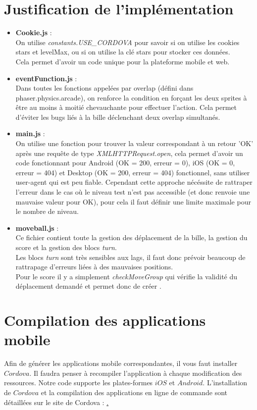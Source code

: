 \documentclass[11pt]{article}
\begin{document}
\section {Justification de l'implémentation}
\begin{itemize}
	\item
		\textbf{Cookie.js} :\\
		On utilise {\em constants.USE\_CORDOVA} pour savoir si on 
		utilise les cookies stars et levelMax, ou si on utilise
		la clé stars pour stocker ces données.\\
		Cela permet d'avoir un code unique pour la plateforme mobile et
		web.\\
	\item
		\textbf{eventFunction.js} :\\
		Dans toutes les fonctions appelées par overlap (défini dans 
		phaser.physics.arcade), on renforce la condition en forçant les
		deux sprites à être au moins à moitié chevauchante pour
		effectuer l'action. Cela permet d'éviter les bugs liés à la
		bille déclenchant deux overlap simultanés.\\
	\item
		\textbf{main.js} : \\
		On utilise une fonction pour trouver la valeur correspondant à
		un retour 'OK' après une requête de type 
		{\em XMLHTTPRequest.open}, cela permet d'avoir un code
		fonctionnant pour Android (OK = 200, erreur = 0), iOS (OK = 0,
		erreur = 404) et Desktop (OK = 200, erreur = 404) fonctionnel, 
		sans utiliser user-agent qui est peu fiable. Cependant cette
		approche nécéssite de rattraper l'erreur dans le cas où le 
		niveau test n'est pas accessible (et donc renvoie une mauvaise 
		valeur pour OK), pour cela il faut définir une limite maximale
		pour le nombre de niveau.\\
	\item
		\textbf{moveball.js} : \\
		Ce fichier contient toute la gestion des déplacement de la
		bille, la gestion du score et la gestion des blocs {\em turn}.\\
		Les blocs {\em turn} sont très sensibles aux lags, il faut
		donc prévoir beaucoup de rattrapage d'erreurs liées à des 
		mauvaises positions.\\
		Pour le score il y a simplement {\em checkMoveGroup} qui
		vérifie la validité du déplacement demandé et permet donc de 
		créer .\\
\end{itemize}

\section{Compilation des applications mobile}

Afin de générer les applications mobile correspondantes, il vous faut installer $Cordova$. Il faudra penser à recompiler l'application à chaque modification des ressources. Notre code supporte les plates-formes $iOS$ et $Android$. L'installation de $Cordova$ et la compilation des applications en ligne de commande sont détaillées sur le site de Cordova : \href{http://cordova.apache.org/docs/en/3.5.0/guide_cli_index.md.html#The%20Command-Line%20Interface}.
\end{document}
